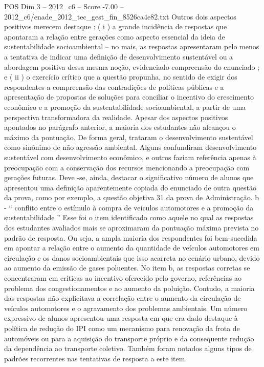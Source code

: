 \begin{textsample}{POS Dim 3 – 2012\_c6 – Score -7.00 – 2012\_c6/enade\_2012\_tec\_gest\_fin\_8526ca4e82.txt}
Outros dois aspectos positivos merecem destaque : ( i ) a grande incidência de respostas que apontaram a relação entre gerações como aspecto essencial da ideia de sustentabilidade socioambiental – no mais, as respostas apresentaram pelo menos a tentativa de indicar uma definição de desenvolvimento sustentável ou a abordagem positiva dessa mesma noção, evidenciado compreensão do enunciado ; e ( ii ) o exercício crítico que a questão propunha, no sentido de exigir dos respondentes a compreensão das contradições de políticas públicas e a apresentação de propostas de soluções para conciliar o incentivo do crescimento econômico e a promoção da sustentabilidade socioambiental, a partir de uma perspectiva transformadora da realidade.
Apesar dos aspectos positivos apontados no parágrafo anterior, a maioria dos estudantes não alcançou o máximo da pontuação.
De forma geral, trataram o desenvolvimento sustentável como sinônimo de não agressão ambiental.
Alguns confundiram desenvolvimento sustentável com desenvolvimento econômico, e outros faziam referência apenas à preocupação com a conservação dos recursos mencionando a preocupação com gerações futuras.
Deve -se, ainda, destacar o significativo número de alunos que apresentou uma definição aparentemente copiada do enunciado de outra questão da prova, como por exemplo, a questão objetiva 31 da prova de Administração. b - “ conflito entre o estímulo à compra de veículos automotores e a promoção da sustentabilidade ” Esse foi o item identificado como aquele no qual as respostas dos estudantes avaliados mais se aproximaram da pontuação máxima prevista no padrão de resposta.
Ou seja, a ampla maioria dos respondentes foi bem-sucedida em apontar a relação entre o aumento da quantidade de veículos automotores em circulação e os danos socioambientais que isso acarreta no cenário urbano, devido ao aumento da emissão de gases poluentes.
No item b, as respostas corretas se concentraram em críticas ao incentivo oferecido pelo governo, referências ao problema dos congestionamentos e ao aumento da poluição.
Contudo, a maioria das respostas não explicitava a correlação entre o aumento da circulação de veículos automotores e o agravamento dos problemas ambientais.
Um número expressivo de alunos apresentou uma resposta em que era dado destaque à política de redução do IPI como um mecanismo para renovação da frota de automóveis ou para a aquisição do transporte próprio e da consequente redução da dependência ao transporte coletivo.
Também foram notados alguns tipos de padrões recorrentes nas tentativas de resposta a este item.

\end{textsample}
